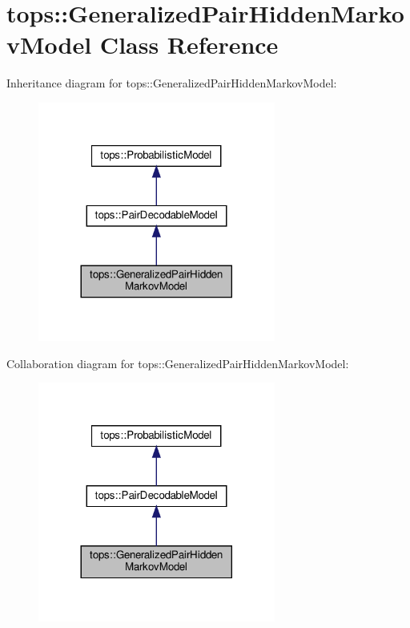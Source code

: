 \hypertarget{classtops_1_1GeneralizedPairHiddenMarkovModel}{}\section{tops\+:\+:Generalized\+Pair\+Hidden\+Markov\+Model Class Reference}
\label{classtops_1_1GeneralizedPairHiddenMarkovModel}


Inheritance diagram for tops\+:\+:Generalized\+Pair\+Hidden\+Markov\+Model\+:
\nopagebreak
\begin{figure}[H]
\begin{center}
\leavevmode
\includegraphics[width=221pt]{classtops_1_1GeneralizedPairHiddenMarkovModel__inherit__graph}
\end{center}
\end{figure}


Collaboration diagram for tops\+:\+:Generalized\+Pair\+Hidden\+Markov\+Model\+:
\nopagebreak
\begin{figure}[H]
\begin{center}
\leavevmode
\includegraphics[width=221pt]{classtops_1_1GeneralizedPairHiddenMarkovModel__coll__graph}
\end{center}
\end{figure}
